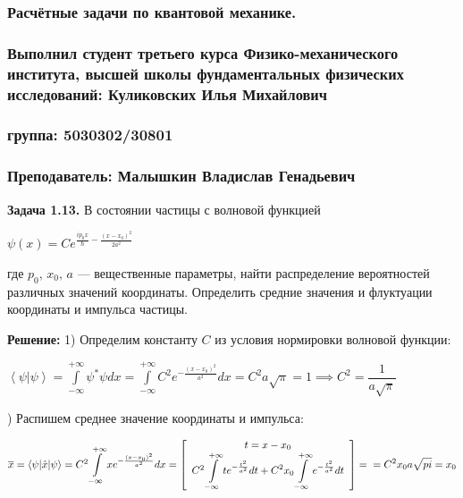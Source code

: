 \documentclass[a4paper, 12pt]{article}
\begin{document}
	
	\begin{center}
		\subsubsection*{Расчётные задачи по квантовой механике.}
		\subsubsection*{Выполнил студент третьего курса Физико-механического института, высшей школы фундаментальных физических исследований: Куликовских Илья Михайлович}
		\subsubsection*{группа: 5030302/30801}
		\subsubsection*{Преподаватель: Малышкин Владислав Генадьевич}
	\end{center}
	
	\quad \textbf{Задача 1.13.} В состоянии частицы с волновой функцией  
	\begin{center}
		$\psi (x) = C e^ {\frac{i p_0 x}{\hbar} - \frac{(x - x_0)^2}{2a^2} }$
	\end{center}
	где \( p_0, \, x_0, \, a \) — вещественные параметры, найти распределение вероятностей различных значений координаты. Определить средние значения и флуктуации координаты и импульса частицы.
	 
	\quad \textbf{Решение: } 1) Определим константу $C$ из условия нормировки волновой функции: 
	
	\begin{center}
		$\left< \psi | \psi \right> = \displaystyle\int\limits_{-\infty}^{+\infty} \psi^* \psi dx = \displaystyle\int\limits_{-\infty}^{+\infty} C^2 e^{-\frac{(x-x_0)^2}{a^2}} dx = C^2 a\sqrt{\pi} = 1 \implies C^2 = \dfrac{1}{a\sqrt{\pi}}$
	\end{center}
	
	) Распишем среднее значение координаты и импульса: 
	
	$\overline{x} = \left< \psi | \hat{x} | \psi \right> = C^2 \displaystyle\int\limits_{-\infty}^{+\infty} xe^{-\frac{(x-x_0)^2}{a^2}} dx = \left[\begin{array}{c}
		t = x-x_0 \\
		C^2\displaystyle\int\limits_{-\infty}^{+\infty} te^{-\frac{t^2}{a^2}} dt +  C^2 x_0 \displaystyle\int\limits_{-\infty}^{+\infty} e^{-\frac{t^2}{a^2}} dt
	\end{array}\right] = \newline = C^2 x_0 a\sqrt{pi} = x_0 $
	
\end{document}
